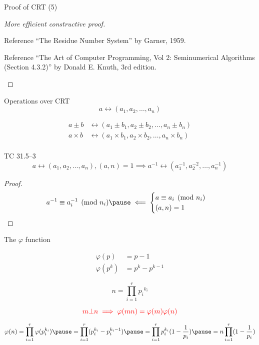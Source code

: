 \begin{frame}{Proof of CRT (5)}
  \begin{proof}[More efficient constructive proof]
	\begin{alertblock}{Reference}
	  ``The Residue Number System'' by Garner, 1959.
	\end{alertblock}

	\begin{alertblock}{Reference}
	  ``The Art of Computer Programming, Vol 2: Seminumerical Algorithms (Section 4.3.2)'' by Donald E. Knuth, 3rd edition.
	\end{alertblock}
  \end{proof}
\end{frame}
\begin{frame}{Operations over CRT}
  \[
	a \leftrightarrow (a_1, a_2, \ldots, a_n)
  \]

  \begin{align*}
	a \pm b &\leftrightarrow (a_1 \pm b_1, a_2 \pm b_2, \ldots, a_n \pm b_n) \\
	a \times b &\leftrightarrow (a_1 \times b_1, a_2 \times b_2, \ldots, a_n \times b_n) \\
  \end{align*}

  \pause
  \vspace{-0.30cm}

  \begin{exampleblock}{TC 31.5--3}
	\[
	 a \leftrightarrow (a_1, a_2, \ldots, a_n), (a,n) = 1 \implies a^{-1} \leftrightarrow (a_1^{-1}, a_2^{-2}, \ldots, a_n^{-1})
	\]
  \end{exampleblock}

  \pause
  \begin{proof}
	\begin{equation*}
	  a^{-1} \equiv a_i^{-1} \pmod{n_i} \pause \impliedby \begin{cases}
		a \equiv a_i \pmod{n_i} \\
		(a,n) = 1
	  \end{cases}
	\end{equation*}
  \end{proof}
\end{frame}
\begin{frame}{The $\varphi$ function}
  \begin{theorem}
	\begin{align*}
	  \varphi(p) &= p - 1 \\
	  \varphi(p^k) &= p^k - p^{k-1}
	\end{align*}
  \end{theorem}

  \pause

  \[
	n = \prod_{i=1}^{r} {p_i}^{k_i}
  \]

  \pause
  \[
	\textcolor{red}{m \bot n \implies \varphi(mn) = \varphi(m) \varphi(n)}
  \]

  \pause
  \[
	\varphi(n) = \prod_{i=1}^{r} \varphi(p_i^{k_i}) 
	    \pause = \prod_{i=1}^{r} (p_i^{k_i} - p_{i}^{k_i - 1})
		\pause = \prod_{i=1}^{r} p_i^{k_i} (1 - \frac{1}{p_i})
		\pause = n \prod_{i=1}^{r} (1 - \frac{1}{p_i})
  \]
\end{frame}

